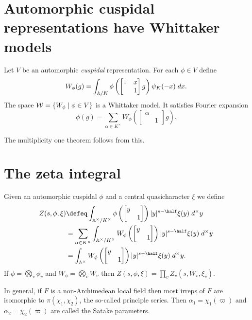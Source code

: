 \section{Automorphic cuspidal representations have Whittaker models}
\begin{theorem}
  Let $V$ be an automorphic \emph{cuspidal} representation.
  For each $\phi \in V$ define
  \[ W_\phi(g) = \int_{\AA/K} \phi\left( \begin{bmatrix}
      1 & x \\ & 1
  \end{bmatrix} g\right) \psi_K(-x) \; dx.
  \]
  The space $\WW = \left\{ W_\phi \mid \phi \in V \right\}$ is a Whittaker model.
  It satisfies Fourier expansion
  \[ \phi(g) = \sum_{\alpha \in K^\times}
    W_\phi \left( \begin{bmatrix} \alpha \\ & 1 \end{bmatrix} g\right).  \]
\end{theorem}
The multiplicity one theorem follows from this.

\section{The zeta integral}
Given an automorphic cuspidal $\phi$
and a central quasicharacter $\xi$ we define
\begin{align*}
  Z(s, \phi, \xi)
  &\defeq \int_{\AA^\times/K^\times}
  \phi\left( \begin{bmatrix} y \\ & 1 \end{bmatrix} \right)
  |y|^{s-\half} \xi(y) \; d^\times y \\
  &= \sum_{\alpha \in K^\times} \int_{\AA^\times/K^\times}
  W_\phi\left( \begin{bmatrix} y \\ & 1 \end{bmatrix} \right)
  |y|^{s-\half} \xi(y) \; d^\times y \\
  &= \int_{\AA^\times}
  W_\phi\left( \begin{bmatrix} y \\ & 1 \end{bmatrix} \right)
  |y|^{s-\half} \xi(y) \; d^\times y.
\end{align*}
If $\phi = \bigotimes_v \phi_v$ and $W_\phi = \bigotimes_v W_v$
then $Z(s, \phi, \xi) = \prod_v Z_v(s, W_v, \xi_v)$.

In general, if $F$ is a non-Archimedean local field
then most irreps of $F$ are isomorphic to $\pi(\chi_1, \chi_2)$,
the so-called principle series.
Then $\alpha_1 = \chi_1(\varpi)$ and $\alpha_2 = \chi_2(\varpi)$
are called the Satake parameters.

